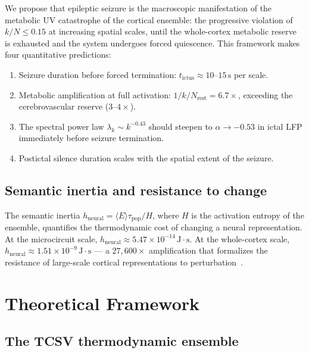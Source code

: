 \documentclass[aps,pre,twocolumn,showpacs,superscriptaddress,longbibliography]{revtex4-2}
\newcommand{\kN}{k/N}
\newcommand{\taupop}{\tau_{\mathrm{pop}}}
\newcommand{\hneu}{h_{\mathrm{neural}}}
\begin{document}
We propose that epileptic seizure is the macroscopic
manifestation of the metabolic UV catastrophe of the cortical
ensemble: the progressive violation of $\kN \leq 0.15$ at
increasing spatial scales, until the whole-cortex metabolic
reserve is exhausted and the system undergoes forced quiescence.
This framework makes four quantitative predictions:
\begin{enumerate}
\item Seizure duration before forced termination:
  $t_{\mathrm{ictus}} \approx 10$--$15\,\mathrm{s}$ per scale.
\item Metabolic amplification at full activation:
  $1/\kN_{\mathrm{rest}} = 6.7\times$, exceeding the
  cerebrovascular reserve ($3$--$4\times$).
\item The spectral power law $\lambda_k \sim k^{-0.43}$
  should steepen to $\alpha \to -0.53$ in ictal LFP
  immediately before seizure termination.
\item Postictal silence duration scales with the spatial
  extent of the seizure.
\end{enumerate}

\subsection{Semantic inertia and resistance to change}

The semantic inertia $\hneu = \langle E \rangle \taupop / H$,
where $H$ is the activation entropy of the ensemble, quantifies
the thermodynamic cost of changing a neural representation.
At the microcircuit scale, $\hneu \approx 5.47 \times
10^{-14}\,\mathrm{J\cdot s}$. At the whole-cortex scale,
$\hneu \approx 1.51 \times 10^{-9}\,\mathrm{J\cdot s}$ ---
a $27{,}600\times$ amplification that formalizes the resistance
of large-scale cortical representations to
perturbation~\cite{McClelland1995}.

\section{\label{sec:theory}Theoretical Framework}

\subsection{The TCSV thermodynamic ensemble}
\end{document}
